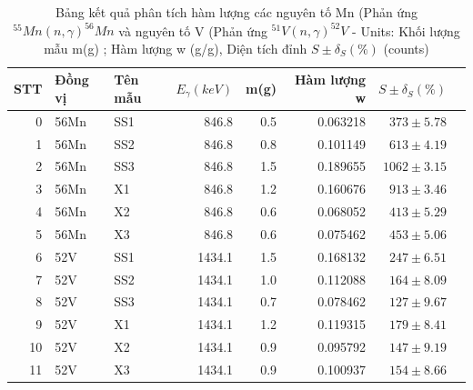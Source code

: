 \begin{table}[htbp]
    \centering
    \caption{Bảng kết quả phân tích hàm lượng các nguyên tố Mn (Phản ứng  $^{55}Mn (n,\gamma) ^{56}Mn$  và nguyên tố V (Phản ứng $^{51}V (n,\gamma) ^{52}V$ - Units: Khối lượng mẫu m(g) ; Hàm lượng w (g/g), Diện tích đỉnh $S \pm \delta_S (\%)$ (counts)}
      \begin{tabular}{rllrrrrr}
    \hline
    STT     & Đồng vị & Tên mẫu & $E_\gamma (keV)$ & m(g) & Hàm lượng w & $S \pm \delta_S (\%)$ \\
    \hline
    0     & 56Mn  & SS1   & 846.8 & 0.5   & 0.063218 & $373 \pm 5.78$ \\
    1     & 56Mn  & SS2   & 846.8 & 0.8   & 0.101149 & $613  \pm 4.19$ \\
    2     & 56Mn  & SS3   & 846.8 & 1.5   & 0.189655 & $1062  \pm  3.15$ \\
    3     & 56Mn  & X1    & 846.8 & 1.2   & 0.160676 & $913   \pm  3.46$ \\
    4     & 56Mn  & X2    & 846.8 & 0.6   & 0.068052 & $413   \pm  5.29 $\\
    5     & 56Mn  & X3    & 846.8 & 0.6   & 0.075462 & $453   \pm  5.06 $\\\hline
    6     & 52V   & SS1   & 1434.1 & 1.5   & 0.168132 & $247   \pm  6.51$ \\
    7     & 52V   & SS2   & 1434.1 & 1.0   & 0.112088 & $164   \pm  8.09 $ \\
    8     & 52V   & SS3   & 1434.1 & 0.7   & 0.078462 & $127   \pm  9.67 $\\
    9     & 52V   & X1    & 1434.1 & 1.2   & 0.119315 & $179   \pm  8.41 $\\
    10    & 52V   & X2    & 1434.1 & 0.9   & 0.095792 & $147   \pm  9.19 $\\
    11    & 52V   & X3    & 1434.1 & 0.9   & 0.100937 & $154   \pm  8.66$ \\
    \hline
      \end{tabular}%
    \label{solieu}%
  \end{table}%
  


